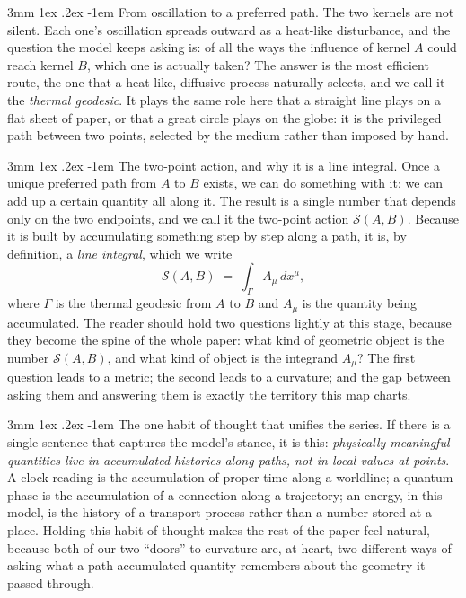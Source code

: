 \documentclass[%
 reprint, amsmath,amssymb, aps, prb, ]{revtex4-2}
\makeatletter
\numberwithin{equation}{section}
\renewcommand\paragraph{%
  \@startsection{paragraph}{4}{\z@}%
    {3mm \@plus 1ex \@minus .2ex}%
    {-1em}%
    {\normalfont\normalsize\itshape}}
\makeatother
\begin{document}
\paragraph{From oscillation to a preferred path.}
The two kernels are not silent. Each one's oscillation spreads outward as a heat-like disturbance, and the question the model keeps asking is: of all the ways the influence of kernel $A$ could reach kernel $B$, which one is actually taken? The answer is the most efficient route, the one that a heat-like, diffusive process naturally selects, and we call it the \emph{thermal geodesic}. It plays the same role here that a straight line plays on a flat sheet of paper, or that a great circle plays on the globe: it is the privileged path between two points, selected by the medium rather than imposed by hand.

\paragraph{The two-point action, and why it is a line integral.}
Once a unique preferred path from $A$ to $B$ exists, we can do something with it: we can add up a certain quantity all along it. The result is a single number that depends only on the two endpoints, and we call it the two-point action $\mathcal{S}(A,B)$. Because it is built by accumulating something step by step along a path, it is, by definition, a \emph{line integral}, which we write
\begin{equation}
\mathcal{S}(A,B) \;=\; \int_{\Gamma} A_\mu\,dx^\mu ,
\label{eq:S-primer}
\end{equation}
where $\Gamma$ is the thermal geodesic from $A$ to $B$ and $A_\mu$ is the quantity being accumulated. The reader should hold two questions lightly at this stage, because they become the spine of the whole paper: what kind of geometric object is the number $\mathcal{S}(A,B)$, and what kind of object is the integrand $A_\mu$? The first question leads to a metric; the second leads to a curvature; and the gap between asking them and answering them is exactly the territory this map charts.

\paragraph{The one habit of thought that unifies the series.}
If there is a single sentence that captures the model's stance, it is this: \emph{physically meaningful quantities live in accumulated histories along paths, not in local values at points}. A clock reading is the accumulation of proper time along a worldline; a quantum phase is the accumulation of a connection along a trajectory; an energy, in this model, is the history of a transport process rather than a number stored at a place. Holding this habit of thought makes the rest of the paper feel natural, because both of our two ``doors'' to curvature are, at heart, two different ways of asking what a path-accumulated quantity remembers about the geometry it passed through.
\end{document}
